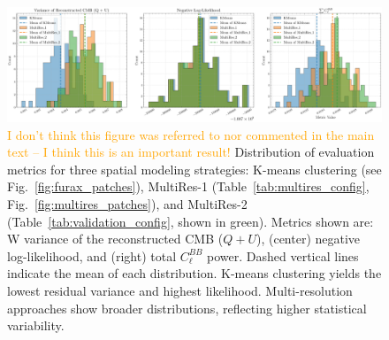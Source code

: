\documentclass[fleqn,usenatbib]{mnras}
\newcommand{\je}[1]{\textcolor{orange}{#1}}
\begin{document}
\begin{figure}
    \centering
    \includegraphics[width=1\linewidth]{figures/variance_likelihood_distributions.pdf}
    \caption{
    \je{I don't think this figure was referred to nor commented  in the main text -- I think this is an important result!}
    Distribution of evaluation metrics for three spatial modeling strategies: K-means clustering (see Fig.~\protect\ref{fig:furax_patches}), MultiRes-1 (Table~\protect\ref{tab:multires_config}, Fig.~\protect\ref{fig:multires_patches}), and MultiRes-2 (Table~\protect\ref{tab:validation_config}, shown in green). 
    Metrics shown are: W variance of the reconstructed CMB ($Q + U$), (center) negative log-likelihood, and (right) total $C_\ell^{BB}$ power. 
    Dashed vertical lines indicate the mean of each distribution. 
    K-means clustering yields the lowest residual variance and highest likelihood. 
    Multi-resolution approaches show broader distributions, reflecting higher statistical variability.
    }


    \label{fig:metric_distributions}
\end{figure}

\vspace{-1em}
\end{document}
